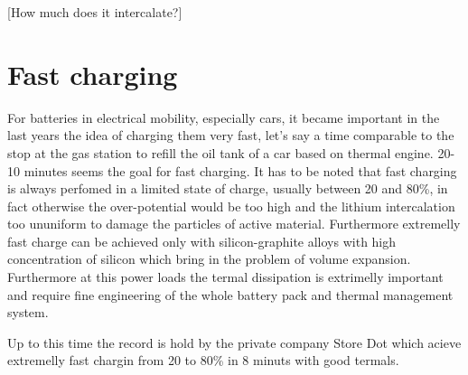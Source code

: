 [How much does it intercalate?]

\section{Fast charging}

For batteries in electrical mobility, especially cars, it became important in the last years the idea of charging them very fast, let's say a time comparable to the stop at the gas station to refill the oil tank of a car based on thermal engine. 20-10 minutes seems the goal for fast charging. It has to be noted that fast charging is always perfomed in a limited state of charge, usually between 20 and 80\%, in fact otherwise the over-potential would be too high and the lithium intercalation too ununiform to damage the particles of active material. Furthermore extremelly fast charge can be achieved only with silicon-graphite alloys with high concentration of silicon which bring in the problem of volume expansion. Furthermore at this power loads the termal dissipation is extrimelly important and require fine engineering of the whole battery pack and thermal management system.

Up to this time the record is hold by the private company Store Dot which acieve extremelly fast chargin from 20 to 80\% in 8 minuts with good termals. 